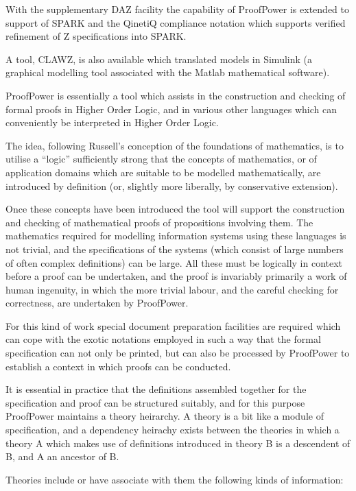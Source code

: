 \documentclass{rbjk}
\begin{document}
\begin{article}
With the supplementary DAZ facility the capability of ProofPower is
extended to support of SPARK and the QinetiQ compliance notation which
supports verified refinement of Z specifications into SPARK.

A tool, CLAWZ, is also available which translated models in Simulink
(a graphical modelling tool associated with the Matlab mathematical
software).

ProofPower is essentially a tool which assists in the construction and
checking of formal proofs in Higher Order Logic, and in various other
languages which can conveniently be interpreted in Higher Order Logic.

The idea, following Russell's conception of the foundations of
mathematics, is to utilise a ``logic'' sufficiently strong that the
concepts of mathematics, or of application domains which are suitable
to be modelled mathematically, are introduced by definition (or,
slightly more liberally, by conservative extension).

Once these concepts have been introduced the tool will support the
construction and checking of mathematical proofs of propositions
involving them.
The mathematics required for modelling information systems using these
languages is not trivial, and the specifications of the systems (which
consist of large numbers of often complex definitions) can be large.
All these must be logically in context before a proof can be
undertaken, and the proof is invariably primarily a work of human
ingenuity, in which the more trivial labour, and the careful checking
for correctness, are undertaken by ProofPower.

For this kind of work special document preparation facilities are
required which can cope with the exotic notations employed in such a
way that the formal specification can not only be printed, but can
also be processed by ProofPower to establish a context in which proofs
can be conducted.

It is essential in practice that the definitions assembled together
for the specification and proof can be structured suitably, and for
this purpose ProofPower maintains a theory heirarchy.
A theory is a bit like a module of specification, and a dependency
heirachy exists between the theories in which a theory A which makes
use of definitions introduced in theory B is a descendent of B, and
A an ancestor of B.

Theories include or have associate with them the following kinds of information:


\end{article}
\end{document}

